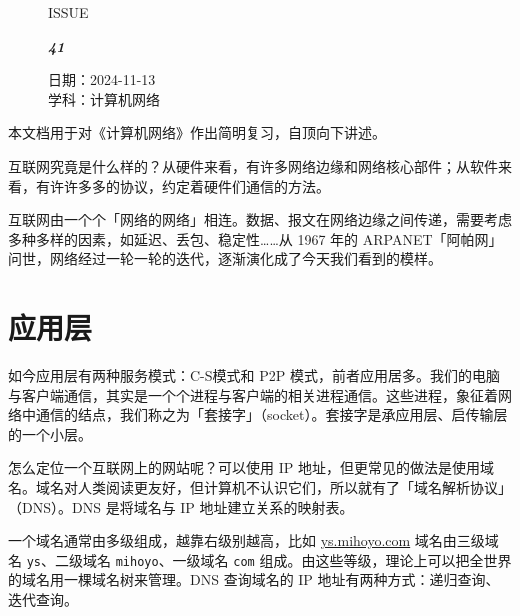 \documentclass[UTF8]{ctexart}
\newcommand\Black[1]{\textcolor[gray]{0.3}{#1}}
\newcommand\Brown[1]{\textcolor[HTML]{998A4E}{#1}}
\newcommand\Concept[1]{\textcolor{cyan!70!black}{#1}}
\newcommand\IssueNumber{41}
\newcommand\Date{2024-11-13}
\newcommand\Subject{计算机网络}
\begin{document}
\begin{figure}[H]
\hspace{1cm}
\begin{minipage}[t]{0.3\textwidth}
\centering
    \Brown{\Genshin ISSUE}

    \vspace{-0.6cm}
    \Huge \Issue\slshape\bfseries\Black{\IssueNumber}
\end{minipage}
\hfill
\begin{minipage}[t]{0.35\textwidth}
\small
\centering
    \Brown{日期：\Date} \\
\vspace{-0.1cm}
    \Brown{学科：\Subject} \\
\end{minipage}
\hspace{0.8cm}
\end{figure}

{\color{darkcyan}
本文档用于对《计算机网络》作出简明复习，自顶向下讲述。

互联网究竟是什么样的？从硬件来看，有许多网络边缘和网络核心部件；从软件来看，有许许多多的协议，约定着硬件们通信的方法。

互联网由一个个「网络的网络」相连。数据、报文在网络边缘之间传递，需要考虑多种多样的因素，如延迟、丢包、稳定性……从 1967 年的 ARPANET「阿帕网」问世，网络经过一轮一轮的迭代，逐渐演化成了今天我们看到的模样。
}


\section{应用层}
如今应用层有两种服务模式：C-S模式和 P2P 模式，前者应用居多。我们的电脑与客户端通信，其实是一个个进程与客户端的相关进程通信。这些进程，象征着网络中通信的结点，我们称之为\Concept{「套接字」（socket）}。套接字是承应用层、启传输层的一个小层。

怎么定位一个互联网上的网站呢？可以使用 IP 地址，但更常见的做法是使用域名。域名对人类阅读更友好，但计算机不认识它们，所以就有了\Concept{「域名解析协议」（DNS）}。DNS 是将域名与 IP 地址建立关系的映射表。

一个域名通常由多级组成，越靠右级别越高，比如 \url{ys.mihoyo.com} 域名由三级域名 \texttt{ys}、二级域名 \texttt{mihoyo}、一级域名 \texttt{com} 组成。由这些等级，理论上可以把全世界的域名用一棵域名树来管理。DNS 查询域名的 IP 地址有两种方式：递归查询、迭代查询。
\end{document}
